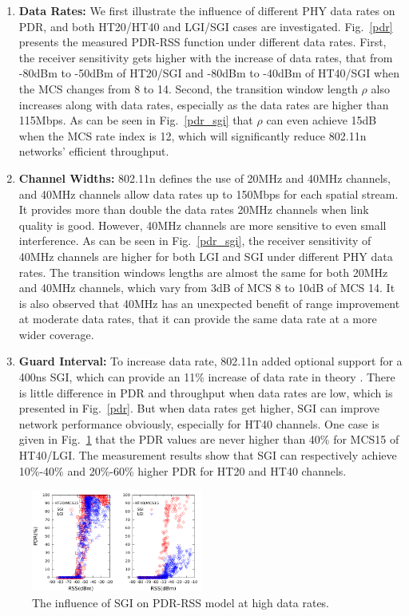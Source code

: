 \documentclass[draftclsnofoot,journal,onecolumn,11pt]{IEEEtran}
\begin{document}
\begin{enumerate}
  \item \textbf{Data Rates:} We first illustrate the influence of different PHY data rates on PDR, and both HT20/HT40 and LGI/SGI cases are investigated. Fig.~\ref{pdr} presents the measured PDR-RSS function under different data rates. First, the receiver sensitivity gets higher with the increase of data rates, that from -80dBm to -50dBm of HT20/SGI and -80dBm to -40dBm of HT40/SGI when the MCS changes from 8 to 14. Second, the transition window length $\rho$ also increases along with data rates, especially as the data rates are higher than 115Mbps. As can be seen in Fig.~\ref{pdr_sgi} that $\rho$ can even achieve 15dB when the MCS rate index is 12, which will significantly reduce 802.11n networks' efficient throughput.
  \item \textbf{Channel Widths:} 802.11n defines the use of 20MHz and 40MHz channels, and 40MHz channels allow data rates up to 150Mbps for each spatial stream. It provides more than double the data rates 20MHz channels when link quality is good. However, 40MHz channels are more sensitive to even small interference. As can be seen in Fig.~\ref{pdr_sgi}, the receiver sensitivity of 40MHz channels are higher for both LGI and SGI under different PHY data rates. The transition windows lengths are almost the same for both 20MHz and 40MHz channels, which vary from 3dB of MCS 8 to 10dB of MCS 14. It is also observed that 40MHz has an unexpected benefit of range improvement at moderate data rates, that it can provide the same data rate at a more wider coverage.
  \item \textbf{Guard Interval:} To increase data rate, 802.11n added optional support for a 400ns SGI, which can provide an 11\% increase of data rate in theory \cite{perahia2008next}. There is little difference in PDR and throughput when data rates are low, which is presented in Fig.~\ref{pdr}. But when data rates get higher, SGI can improve network performance obviously, especially for HT40 channels. One case is given in Fig.~\ref{pdr_sgi_high} that the PDR values are never higher than 40\% for MCS15 of HT40/LGI. The measurement results show that SGI can respectively achieve 10\%-40\% and 20\%-60\% higher PDR for HT20 and HT40 channels.
\end{enumerate}

\begin{figure}[!t]
\centering
    \includegraphics[width=0.5\textwidth]{pdr_sgi.pdf}
\caption{The influence of SGI on PDR-RSS model at high data rates.}
\label{pdr_sgi_high}
\end{figure}
\end{document}

